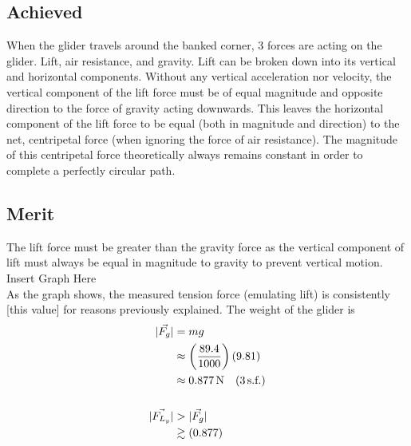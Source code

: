\documentclass[11pt, a4paper]{article}
\begin{document}
	\subsection{Achieved}
	When the glider travels around the banked corner, 3 forces are acting on the glider. Lift, air resistance, and gravity. Lift can be broken down into its vertical and horizontal components. Without any vertical acceleration nor velocity, the vertical component of the lift force must be of equal magnitude and opposite direction to the force of gravity acting downwards. This leaves the horizontal component of the lift force to be equal (both in magnitude and direction) to the net, centripetal force (when ignoring the force of air resistance). The magnitude of this centripetal force theoretically always remains constant in order to complete a perfectly circular path.
	\subsection{Merit}
	The lift force must be greater than the gravity force as the vertical component of lift must always be equal in magnitude to gravity to prevent vertical motion.\\
	Insert Graph Here\\
	As the graph shows, the measured tension force (emulating lift) is consistently [this value] for reasons previously explained.
	The weight of the glider is
	\begin{align}
		|\vec{F_g}|&=mg\\
		&\approx \left(\frac{89.4}{1000}\right)(9.81)\\
		&\approx \SI{0.877}{\newton} \quad (3\, \text{s.f.})\\[\baselineskip]
		|\vec{F_{L_y}}|&>|\vec{F_g}|\\
		&\gtrsim(0.877)
	\end{align}
	
\end{document}
